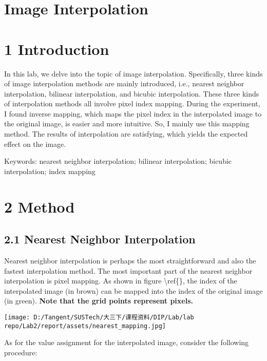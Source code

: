 \documentclass[
]{article}
\author{}
\date{}
\begin{document}
\hypertarget{image-interpolation}{%
\section{Image Interpolation}\label{image-interpolation}}

\hypertarget{1-introduction}{%
\section{1 Introduction}\label{1-introduction}}

In this lab, we delve into the topic of image interpolation.
Specifically, three kinds of image interpolation methods are mainly
introduced, i.e., nearest neighbor interpolation, bilinear
interpolation, and bicubic interpolation. These three kinds of
interpolation methods all involve pixel index mapping. During the
experiment, I found inverse mapping, which maps the pixel index in the
interpolated image to the original image, is easier and more intuitive.
So, I mainly use this mapping method. The results of interpolation are
satisfying, which yields the expected effect on the image.

Keywords: nearest neighbor interpolation; bilinear interpolation;
bicubic interpolation; index mapping

\hypertarget{2-method}{%
\section{2 Method}\label{2-method}}

\hypertarget{21-nearest-neighbor-interpolation}{%
\subsection{2.1 Nearest Neighbor
Interpolation}\label{21-nearest-neighbor-interpolation}}

Nearest neighbor interpolation is perhaps the most straightforward and
also the fastest interpolation method. The most important part of the
nearest neighbor interpolation is pixel mapping. As shown in figure
\textbackslash ref\{\}, the index of the interpolated image (in brown)
can be mapped into the index of the original image (in green).
\textbf{Note that the grid points represent pixels.}

\texttt{[image: D:/Tangent/SUSTech/大三下/课程资料/DIP/Lab/lab repo/Lab2/report/assets/nearest\_mapping.jpg]}

As for the value assignment for the interpolated image, consider the
following procedure:
\end{document}
